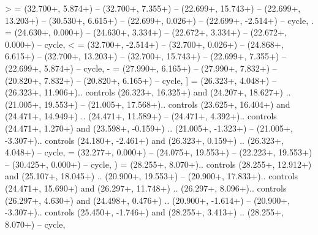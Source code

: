 {>} = {(32.700+\ctpXshift, 5.874+\ctpYshift) -- (32.700+\ctpXshift, 7.355+\ctpYshift) -- (22.699+\ctpXshift, 15.743+\ctpYshift) -- (22.699+\ctpXshift, 13.203+\ctpYshift) -- (30.530+\ctpXshift, 6.615+\ctpYshift) -- (22.699+\ctpXshift, 0.026+\ctpYshift) -- (22.699+\ctpXshift, -2.514+\ctpYshift) -- cycle},
{.} = {(24.630+\ctpXshift, 0.000+\ctpYshift) -- (24.630+\ctpXshift, 3.334+\ctpYshift) -- (22.672+\ctpXshift, 3.334+\ctpYshift) -- (22.672+\ctpXshift, 0.000+\ctpYshift) -- cycle},
{<} = {(32.700+\ctpXshift, -2.514+\ctpYshift) -- (32.700+\ctpXshift, 0.026+\ctpYshift) -- (24.868+\ctpXshift, 6.615+\ctpYshift) -- (32.700+\ctpXshift, 13.203+\ctpYshift) -- (32.700+\ctpXshift, 15.743+\ctpYshift) -- (22.699+\ctpXshift, 7.355+\ctpYshift) -- (22.699+\ctpXshift, 5.874+\ctpYshift) -- cycle},
{-} = {(27.990+\ctpXshift, 6.165+\ctpYshift) -- (27.990+\ctpXshift, 7.832+\ctpYshift) -- (20.820+\ctpXshift, 7.832+\ctpYshift) -- (20.820+\ctpXshift, 6.165+\ctpYshift) -- cycle},
{]} = {(26.323+\ctpXshift, 4.048+\ctpYshift) -- (26.323+\ctpXshift, 11.906+\ctpYshift).. controls (26.323+\ctpXshift, 16.325+\ctpYshift) and (24.207+\ctpXshift, 18.627+\ctpYshift) .. (21.005+\ctpXshift, 19.553+\ctpYshift) -- (21.005+\ctpXshift, 17.568+\ctpYshift).. controls (23.625+\ctpXshift, 16.404+\ctpYshift) and (24.471+\ctpXshift, 14.949+\ctpYshift) .. (24.471+\ctpXshift, 11.589+\ctpYshift) -- (24.471+\ctpXshift, 4.392+\ctpYshift).. controls (24.471+\ctpXshift, 1.270+\ctpYshift) and (23.598+\ctpXshift, -0.159+\ctpYshift) .. (21.005+\ctpXshift, -1.323+\ctpYshift) -- (21.005+\ctpXshift, -3.307+\ctpYshift).. controls (24.180+\ctpXshift, -2.461+\ctpYshift) and (26.323+\ctpXshift, 0.159+\ctpYshift) .. (26.323+\ctpXshift, 4.048+\ctpYshift) -- cycle},
{\ctpbackslash} = {(32.277+\ctpXshift, 0.000+\ctpYshift) -- (24.075+\ctpXshift, 19.553+\ctpYshift) -- (22.223+\ctpXshift, 19.553+\ctpYshift) -- (30.425+\ctpXshift, 0.000+\ctpYshift) -- cycle},
{)} = {(28.255+\ctpXshift, 8.070+\ctpYshift).. controls (28.255+\ctpXshift, 12.912+\ctpYshift) and (25.107+\ctpXshift, 18.045+\ctpYshift) .. (20.900+\ctpXshift, 19.553+\ctpYshift) -- (20.900+\ctpXshift, 17.833+\ctpYshift).. controls (24.471+\ctpXshift, 15.690+\ctpYshift) and (26.297+\ctpXshift, 11.748+\ctpYshift) .. (26.297+\ctpXshift, 8.096+\ctpYshift).. controls (26.297+\ctpXshift, 4.630+\ctpYshift) and (24.498+\ctpXshift, 0.476+\ctpYshift) .. (20.900+\ctpXshift, -1.614+\ctpYshift) -- (20.900+\ctpXshift, -3.307+\ctpYshift).. controls (25.450+\ctpXshift, -1.746+\ctpYshift) and (28.255+\ctpXshift, 3.413+\ctpYshift) .. (28.255+\ctpXshift, 8.070+\ctpYshift) -- cycle},
